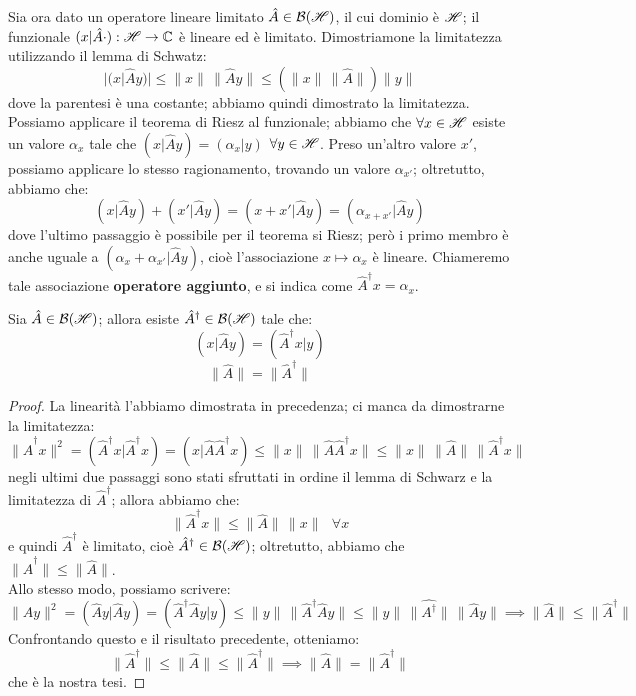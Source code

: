 Sia ora dato un operatore lineare limitato $\hat{A} \in \mathcal{B}(\mathscr{H})$, il cui dominio è $\mathscr{H}$; il funzionale $(x|\hat{A} \cdot ): \mathscr{H} \to \mathbb{C}$ è lineare ed è limitato. Dimostriamone la limitatezza utilizzando il lemma di Schwatz:
$$|(x|\hat{A}y)|\leq \|x\| \, \|\hat{A}y\| \leq (\|x\| \, \|\hat{A}\|)\|y\|$$
dove la parentesi è una costante; abbiamo quindi dimostrato la limitatezza.
Possiamo applicare il teorema di Riesz al funzionale; abbiamo che $\forall x \in \mathscr{H}$ esiste un valore $\alpha_x$ tale che $(x|\hat{A}y)=(\alpha_x|y)$ $\forall y \in \mathscr{H}$. Preso un'altro valore $x'$, possiamo applicare lo stesso ragionamento, trovando un valore $\alpha_{x'}$; oltretutto, abbiamo che:
$$(x|\hat{A}y)+(x'|\hat{A}y)=(x+x'|\hat{A}y)=(\alpha_{x+x'}|\hat{A}y)$$
dove l'ultimo passaggio è possibile per il teorema si Riesz; però i primo membro è anche uguale a $(\alpha_x+\alpha_{x'}|\hat{A}y)$, cioè l'associazione $x \mapsto \alpha_x$ è lineare. Chiameremo tale associazione \textbf{operatore aggiunto}, e si indica come $\hat{A}^{\dagger} x= \alpha_x$.
\begin{teorema}
Sia $\hat{A} \in \mathcal{B}(\mathscr{H})$; allora esiste $\hat{A}^{\dagger} \in \mathcal{B}(\mathscr{H})$ tale che:
$$(x|\hat{A}y)=(\hat{A}^{\dagger}x|y)$$
$$\|\hat{A}\|=\|\hat{A}^{\dagger}\|$$
\end{teorema}
\begin{proof}
La linearità l'abbiamo dimostrata in precedenza; ci manca da dimostrarne la limitatezza:
$$\| \hat{A}^{\dagger} x \|^2=(\hat{A}^{\dagger}x|\hat{A}^{\dagger}x)=(x|\hat{A} \hat{A}^{\dagger} x) \leq  \|x\| \, \|\hat{A} \hat{A}^{\dagger} x \| \leq \|x\| \, \|\hat{A}\| \, \|\hat{A}^{\dagger} x \|$$
negli ultimi due passaggi sono stati sfruttati in ordine il lemma di Schwarz e la limitatezza di $\hat{A}^{\dagger}$;  allora abbiamo che:
$$\| \hat{A}^{\dagger} x \| \leq \|\hat{A}\| \, \|x \| \text{ } \forall x$$
e quindi $\hat{A}^{\dagger}$ è limitato, cioè $\hat{A}^{\dagger} \in \mathcal{B}(\mathscr{H})$; oltretutto, abbiamo che $\|\hat{A}^{\dagger}\| \leq \|\hat{A}\|$.\\
Allo stesso modo, possiamo scrivere:
$$\| \hat{A}y \|^2=(\hat{A}y|\hat{A}y)=(\hat{A}^{\dagger} \hat{A} y|y) \leq  \|y\| \, \|\hat{A}^{\dagger} \hat{A} y \| \leq \|y\| \, \|\hat{A^{\dagger}}\| \, \|\hat{A} y \| \implies \|\hat{A}\| \leq \|\hat{A}^{\dagger}\|$$
Confrontando questo e il risultato precedente, otteniamo:
$$\|\hat{A}^{\dagger}\| \leq \|\hat{A}\| \leq \|\hat{A}^{\dagger}\| \implies \|\hat{A}\| = \|\hat{A}^{\dagger}\|$$
che è la nostra tesi.
\end{proof}
